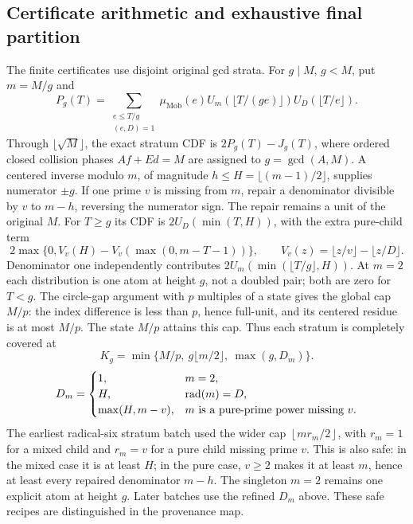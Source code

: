 \documentclass[11pt]{article}
\theoremstyle{definition}\newtheorem{definition}[theorem]{Definition}
\theoremstyle{remark}\newtheorem{remark}[theorem]{Remark}
\newcommand{\floor}[1]{\left\lfloor #1\right\rfloor}
\begin{document}
\subsection{Certificate arithmetic and exhaustive final partition}
\label{ap:finite:partition}

The finite certificates use disjoint original gcd strata.
For \(g\mid M\), \(g<M\), put \(m=M/g\) and
\[
 P_g(T)=\sum_{\substack{e\le T/g\\(e,D)=1}}\mu_{\mathrm{Mob}}(e)
 U_m(\lfloor T/(ge)\rfloor)U_D(\lfloor T/e\rfloor).
\]
Through \(\lfloor\sqrt M\rfloor\), the exact stratum CDF is
\(2P_g(T)-J_g(T)\), where ordered closed collision phases
\(Af+Ed=M\) are assigned to \(g=\gcd(A,M)\).
A centered inverse modulo \(m\), of magnitude
\(h\le H=\lfloor(m-1)/2\rfloor\), supplies numerator \(\pm g\).
If one prime \(v\) is missing from \(m\), repair a denominator
divisible by \(v\) to \(m-h\), reversing the numerator sign.
The repair remains a unit of the original \(M\).
For \(T\ge g\) its CDF is \(2U_D(\min(T,H))\), with the extra pure-child
term
\[
 2\max\{0,V_v(H)-V_v(\max(0,m-T-1))\},\qquad
 V_v(z)=\lfloor z/v\rfloor-\lfloor z/D\rfloor.
\]
Denominator one independently contributes
\(2U_m(\min(\lfloor T/g\rfloor,H))\).
At \(m=2\) each distribution is one atom at height \(g\), not a
doubled pair; both are zero for \(T<g\).
The circle-gap argument with \(p\) multiples of a state gives the
global cap \(M/p\): the index difference is less than \(p\), hence
full-unit, and its centered residue is at most \(M/p\).
The state \(M/p\) attains this cap.  Thus each stratum is completely
covered at
\[
 K_g=\min\{M/p,\ g\lfloor m/2\rfloor,\ \max(g,D_m)\}.
\]
\[
 D_m=\begin{cases}
 1,&m=2,\\
 H,&\operatorname{rad}(m)=D,\\
 \max(H,m-v),&m\hbox{ is a pure-prime power missing }v .
 \end{cases}
\]
The earliest radical-six stratum batch used the wider cap
\(\floor{m r_m/2}\), with \(r_m=1\) for a mixed child and \(r_m=v\)
for a pure child missing prime \(v\). This is also safe: in the mixed
case it is at least \(H\); in the pure case, \(v\ge2\) makes it at
least \(m\), hence at least every repaired denominator \(m-h\).
The singleton \(m=2\) remains one explicit atom at height \(g\).
Later batches use the refined \(D_m\) above. These safe recipes are
distinguished in the provenance map.
\end{document}
